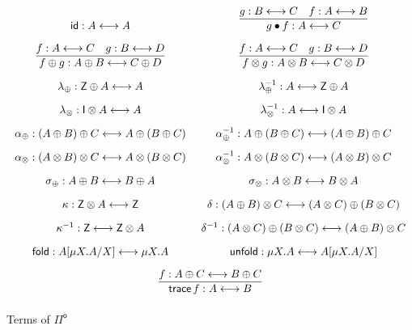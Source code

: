 \documentclass[runningheads,a4paper]{llncs}
\newcommand{\Pio}{\ensuremath{\mathsf{\Pi}^{\mathsf{o}}}}
\newcommand{\id}{\mathsf{id}}
\newcommand{\lr}{\longleftrightarrow}
\newcommand{\fold}{\mathsf{fold}}
\newcommand{\unfold}{\mathsf{unfold}}
\newcommand{\trace}{\ensuremath{\mathsf{trace}}}
\newcommand{\Z}{\mathsf{Z}}
\newcommand{\I}{\mathsf{I}}
\begin{document}
\begin{figure}[t]
\[
\arraycolsep=7pt\def\arraystretch{1.8}
\begin{array}{cc}%
\id : A \lr A
& \infer{g \bullet f : A \lr C}{g : B \lr C & f : A \lr B} \\ [.25cm]
\infer{f \oplus g : A \oplus B \lr C \oplus D}{f : A \lr C & g : B \lr D} 
& \infer{f \otimes g : A \otimes B \lr C \otimes D}{f : A \lr C & g : B \lr D} \\
\lambda_{\oplus} : \Z \oplus A \lr A
& \lambda_{\oplus}^{-1} : A \lr \Z \oplus A\\
\lambda_{\otimes} : \I \otimes A \lr A
& \lambda_{\otimes}^{-1} : A \lr \I \otimes A\\
\alpha_{\oplus} : (A \oplus B) \oplus C \lr A \oplus (B \oplus C)
& \alpha_{\oplus}^{-1} : A \oplus (B \oplus C) \lr (A \oplus B) \oplus C \\
\alpha_{\otimes} : (A \otimes B) \otimes C \lr A \otimes (B \otimes C)
& \alpha_{\otimes}^{-1} : A \otimes (B \otimes C) \lr (A \otimes B) \otimes C \\
\sigma_{\oplus} : A \oplus B \lr B \oplus A
& \sigma_{\otimes} : A \otimes B \lr B \otimes A \\
\kappa : \Z \otimes A \lr \Z 
& \delta : (A \oplus B) \otimes C \lr (A \otimes C) \oplus (B \otimes C) \\
\kappa^{-1} : \Z \lr \Z \otimes A
& \delta^{-1} : (A \otimes C) \oplus (B \otimes C)  \lr (A \oplus B) \otimes C \\
\fold : A[\mu X.A/X] \lr \mu X.A
& \unfold : \mu X.A \lr A[\mu X.A/X] \\[.25cm]
\multicolumn{2}{c}{\infer{\trace \,f: A \lr B}{f : A \oplus C \lr B \oplus C}} \\
\end{array}
\]
\caption{Terms of \Pio}
\label{fig:programs}
\end{figure}
\end{document}
